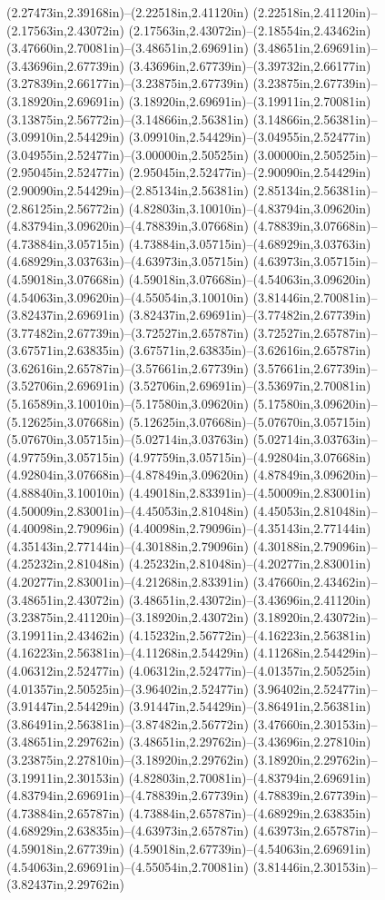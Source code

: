 (2.27473in,2.39168in)--(2.22518in,2.41120in) (2.22518in,2.41120in)--(2.17563in,2.43072in) (2.17563in,2.43072in)--(2.18554in,2.43462in) (3.47660in,2.70081in)--(3.48651in,2.69691in) (3.48651in,2.69691in)--(3.43696in,2.67739in) (3.43696in,2.67739in)--(3.39732in,2.66177in) (3.27839in,2.66177in)--(3.23875in,2.67739in) (3.23875in,2.67739in)--(3.18920in,2.69691in) (3.18920in,2.69691in)--(3.19911in,2.70081in) (3.13875in,2.56772in)--(3.14866in,2.56381in) (3.14866in,2.56381in)--(3.09910in,2.54429in) (3.09910in,2.54429in)--(3.04955in,2.52477in) (3.04955in,2.52477in)--(3.00000in,2.50525in) (3.00000in,2.50525in)--(2.95045in,2.52477in) (2.95045in,2.52477in)--(2.90090in,2.54429in) (2.90090in,2.54429in)--(2.85134in,2.56381in) (2.85134in,2.56381in)--(2.86125in,2.56772in) (4.82803in,3.10010in)--(4.83794in,3.09620in) (4.83794in,3.09620in)--(4.78839in,3.07668in) (4.78839in,3.07668in)--(4.73884in,3.05715in) (4.73884in,3.05715in)--(4.68929in,3.03763in) (4.68929in,3.03763in)--(4.63973in,3.05715in) (4.63973in,3.05715in)--(4.59018in,3.07668in) (4.59018in,3.07668in)--(4.54063in,3.09620in) (4.54063in,3.09620in)--(4.55054in,3.10010in) (3.81446in,2.70081in)--(3.82437in,2.69691in) (3.82437in,2.69691in)--(3.77482in,2.67739in) (3.77482in,2.67739in)--(3.72527in,2.65787in) (3.72527in,2.65787in)--(3.67571in,2.63835in) (3.67571in,2.63835in)--(3.62616in,2.65787in) (3.62616in,2.65787in)--(3.57661in,2.67739in) (3.57661in,2.67739in)--(3.52706in,2.69691in) (3.52706in,2.69691in)--(3.53697in,2.70081in) (5.16589in,3.10010in)--(5.17580in,3.09620in) (5.17580in,3.09620in)--(5.12625in,3.07668in) (5.12625in,3.07668in)--(5.07670in,3.05715in) (5.07670in,3.05715in)--(5.02714in,3.03763in) (5.02714in,3.03763in)--(4.97759in,3.05715in) (4.97759in,3.05715in)--(4.92804in,3.07668in) (4.92804in,3.07668in)--(4.87849in,3.09620in) (4.87849in,3.09620in)--(4.88840in,3.10010in) (4.49018in,2.83391in)--(4.50009in,2.83001in) (4.50009in,2.83001in)--(4.45053in,2.81048in) (4.45053in,2.81048in)--(4.40098in,2.79096in) (4.40098in,2.79096in)--(4.35143in,2.77144in) (4.35143in,2.77144in)--(4.30188in,2.79096in) (4.30188in,2.79096in)--(4.25232in,2.81048in) (4.25232in,2.81048in)--(4.20277in,2.83001in) (4.20277in,2.83001in)--(4.21268in,2.83391in) (3.47660in,2.43462in)--(3.48651in,2.43072in) (3.48651in,2.43072in)--(3.43696in,2.41120in) (3.23875in,2.41120in)--(3.18920in,2.43072in) (3.18920in,2.43072in)--(3.19911in,2.43462in) (4.15232in,2.56772in)--(4.16223in,2.56381in) (4.16223in,2.56381in)--(4.11268in,2.54429in) (4.11268in,2.54429in)--(4.06312in,2.52477in) (4.06312in,2.52477in)--(4.01357in,2.50525in) (4.01357in,2.50525in)--(3.96402in,2.52477in) (3.96402in,2.52477in)--(3.91447in,2.54429in) (3.91447in,2.54429in)--(3.86491in,2.56381in) (3.86491in,2.56381in)--(3.87482in,2.56772in) (3.47660in,2.30153in)--(3.48651in,2.29762in) (3.48651in,2.29762in)--(3.43696in,2.27810in) (3.23875in,2.27810in)--(3.18920in,2.29762in) (3.18920in,2.29762in)--(3.19911in,2.30153in) (4.82803in,2.70081in)--(4.83794in,2.69691in) (4.83794in,2.69691in)--(4.78839in,2.67739in) (4.78839in,2.67739in)--(4.73884in,2.65787in) (4.73884in,2.65787in)--(4.68929in,2.63835in) (4.68929in,2.63835in)--(4.63973in,2.65787in) (4.63973in,2.65787in)--(4.59018in,2.67739in) (4.59018in,2.67739in)--(4.54063in,2.69691in) (4.54063in,2.69691in)--(4.55054in,2.70081in) (3.81446in,2.30153in)--(3.82437in,2.29762in) 